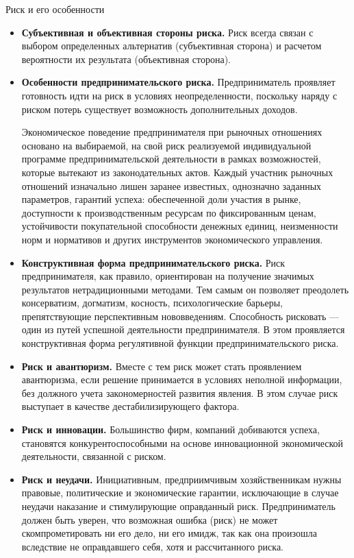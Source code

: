 \documentclass[financial_risks_lectures.tex]{subfiles}
\begin{document}
\begin{frame}[allowframebreaks]{Риск и его особенности}{}
  \begin{itemize}
  \item
  \textbf{Субъективная и объективная стороны риска.} Риск всегда связан с выбором определенных альтернатив (субъективная сторона) и расчетом вероятности их результата (объективная сторона).
  \item
  \textbf{Особенности предпринимательского риска.} Предприниматель проявляет готовность идти на риск в условиях неопределенности, поскольку наряду с риском потерь существует возможность дополнительных доходов. 
  
  Экономическое поведение предпринимателя при рыночных отношениях основано на выбираемой, на свой риск реализуемой индивидуальной программе предпринимательской деятельности в рамках возможностей, которые вытекают из законодательных актов. Каждый участник рыночных отношений изначально лишен заранее известных, однозначно заданных параметров, гарантий успеха: обеспеченной доли участия в рынке, доступности к производственным ресурсам по фиксированным ценам, устойчивости покупательной способности денежных единиц, неизменности норм и нормативов и других инструментов экономического управления.
  \item
  \textbf{Конструктивная форма предпринимательского риска.} Риск предпринимателя, как правило, ориентирован на получение значимых результатов нетрадиционными методами. Тем самым он позволяет преодолеть консерватизм, догматизм, косность, психологические барьеры, препятствующие перспективным нововведениям. Способность рисковать — один из путей успешной деятельности предпринимателя. В этом проявляется конструктивная форма регулятивной функции предпринимательского риска.
  \item
  \textbf{Риск и авантюризм.} Вместе с тем риск может стать проявлением авантюризма, если решение принимается в условиях неполной информации, без должного учета закономерностей развития явления. В этом случае риск выступает в качестве дестабилизирующего фактора.
  \item
  \textbf{Риск и инновации.} Большинство фирм, компаний добиваются успеха, становятся конкурентоспособными на основе инновационной экономической деятельности, связанной с риском.
	\item
\textbf{Риск и неудачи. }Инициативным, предприимчивым хозяйственникам нужны правовые, политические и экономические гарантии, исключающие в случае неудачи наказание и стимулирующие оправданный риск. Предприниматель должен быть уверен, что возможная ошибка (риск) не может скомпрометировать ни его дело, ни его имидж, так как она произошла вследствие не оправдавшего себя, хотя и рассчитанного риска.
  \end{itemize}
\end{frame}
\end{document}
